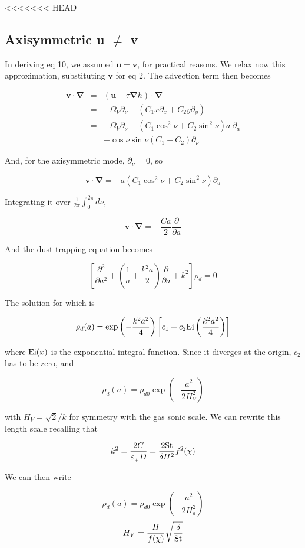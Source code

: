 \documentclass[apj]{emulateapj}
\newcommand{\pderiv}[2]{\frac{\partial #1}{\partial #2}}
\newcommand{\pderivn}[3]{\frac{\partial^{#3} #1}{\partial #2^{#3}}}
\renewcommand{\v}[1]{{\boldsymbol{#1}}} %
\newcommand{\del}{\v{\nabla}}
\newcommand{\grad}{\del}
\newcommand{\beq}{\begin{equation}}
\newcommand{\eeq}{\end{equation}}
\newcommand{\beqn}{\begin{eqnarray}}
\newcommand{\eeqn}{\end{eqnarray}}
\newcommand{\epsp}{\varepsilon_{_{+}}}
\begin{document}
<<<<<<< HEAD
\subsection{Axisymmetric u $\ne$ v }

In deriving eq 10, we assumed $\v{u}=\v{v}$, for practical reasons. We
relax now this approximation, substituting $\v{v}$ for eq 2. The
advection term then becomes 

\beqn
\v{v}\cdot\del &=& (\v{u} + \tau \grad h) \cdot \del \nonumber \\
&=& - \varOmega_V \partial_\nu - \left( C_1 x \partial_x + C_2 y
  \partial_y\right) \nonumber \\
&=& - \varOmega_V \partial_\nu - \left( C_1 \cos^2\nu   + C_2
  \sin^2\nu \right) a \ \partial_a \nonumber \\
&&+ \cos\nu\sin\nu  (C_1 - C_2) \partial_\nu
\eeqn

And, for the axisymmetric mode, $\partial_\nu=0$, so

\beq
\v{v}\cdot\del = - a \left( C_1  \cos^2\nu  + C_2  \sin^2\nu \right) \partial_a
\eeq

Integrating it over $\frac{1}{2\pi}\int_0^{2\pi} d\nu$, 

\beq
\v{v}\cdot\del = - \frac{C a}{2} \pderiv{}{a}
\eeq

And the dust trapping equation becomes 

\beq
\left[\pderivn{}{a}{2} + \left(\frac{1}{a} +
  \frac{k^2a}{2}\right)\pderiv{}{a} + k^2\right]\rho_d = 0 
\eeq

The solution for which is 

\beq
\rho_d(a) = \exp\left(-\frac{k^2a^2}{4}\right)  \left[c_1 + c_2 {\rm
    Ei}\left(\frac{k^2a^2}{4}\right)\right]
\eeq

\noindent where ${\rm Ei}(x)$ is the exponential integral function. 
Since it diverges at the origin, $c_2$ has to be zero, and 

\beq
\rho_d(a) = \rho_{d0} \exp\left(-\frac{a^2}{2H_V^2}\right)
\eeq

with $H_V = \sqrt{2}/k$ for symmetry with the gas sonic scale. We can 
rewrite this length scale recalling that 

\beqn
k^2 = \frac{2C}{\epsp D} = \frac{2{\rm St}}{\delta H^2} f^2(\chi)
\eeqn 

\noindent We can then write 

\beq\label{eq:gen_axi}
\rho_d(a) = \rho_{d0} \exp\left(-\frac{a^2}{2H_a^2}\right)
\eeq
\beq
 H_V = \frac{H}{f(\chi)} \sqrt{\frac{\delta}{\rm St}}
\eeq
\end{document}
